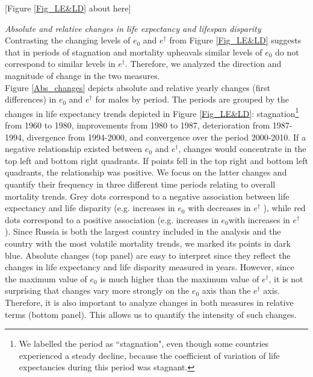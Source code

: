 \documentclass{article}
\begin{document}
\begin{spacing}{1.5}
\begin{center}
[Figure \ref{Fig_LE&LD} about here]
\end{center}

\emph{Absolute and relative changes in life expectancy and lifespan disparity}\\


Contrasting the changing levels of $e_0$ and $e^\dagger$ from Figure \ref{Fig_LE&LD} suggests that in periods of stagnation and mortality upheavals similar levels of $e_0$ do not correspond to similar levels in $e^\dagger$. Therefore, we analyzed the direction and magnitude of change in the two measures. \\

Figure \ref{Abs_changes} depicts absolute and relative yearly changes (first differences) in $e_0$ and $e^\dagger$ for males by period. The periods are grouped by the changes in life expectancy trends depicted in Figure \ref{Fig_LE&LD}: stagnation\footnote{We labelled the period as ``stagnation", even though some countries experienced a steady decline, because the coefficient of variation of life expectancies during this period was stagnant.} from 1960 to 1980, improvements from 1980 to 1987, deterioration from 1987-1994, divergence from 1994-2000, and convergence over the period 2000-2010.  If a negative relationship existed between $e_0$ and $e^\dagger$, changes would concentrate in the top left and bottom right quadrants. If points fell in the top right and bottom left quadrants, the relationship was positive. We focus on the latter changes and quantify their frequency in three different time periods relating to overall mortality trends. Grey dots correspond to a negative association between life expectancy and life disparity (e.g. increases in $e_0$ with decreases in $e^\dagger$ ), while red dots correspond to a positive association (e.g. increases in $e_0$with increases in $e^\dagger$ ). Since Russia is both the largest country included in the analysis and the country with the most volatile mortality trends, we marked its points in dark blue. Absolute changes (top panel) are easy to interpret since they reflect the changes in life expectancy and life disparity measured in years. However, since the maximum value of $e_0$ is much higher than the maximum value of $e^\dagger$, it is not surprising that changes vary more strongly on the  $e_0$ axis than the $e^\dagger$ axis. Therefore, it is also important to analyze changes in both measures in relative terms (bottom panel).  This allows us to quantify the intensity of such changes.\\


\end{spacing}
\end{document}
